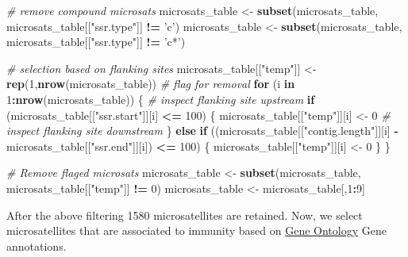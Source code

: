 \documentclass[]{article}
\newenvironment{Shaded}{\begin{snugshade}}{\end{snugshade}}
\newcommand{\KeywordTok}[1]{\textcolor[rgb]{0.13,0.29,0.53}{\textbf{#1}}}
\newcommand{\DecValTok}[1]{\textcolor[rgb]{0.00,0.00,0.81}{#1}}
\newcommand{\StringTok}[1]{\textcolor[rgb]{0.31,0.60,0.02}{#1}}
\newcommand{\CommentTok}[1]{\textcolor[rgb]{0.56,0.35,0.01}{\textit{#1}}}
\newcommand{\ControlFlowTok}[1]{\textcolor[rgb]{0.13,0.29,0.53}{\textbf{#1}}}
\newcommand{\OperatorTok}[1]{\textcolor[rgb]{0.81,0.36,0.00}{\textbf{#1}}}
\newcommand{\NormalTok}[1]{#1}
\begin{document}
\begin{Shaded}
\begin{Highlighting}[]
\CommentTok{# remove compound microsats}
\NormalTok{microsats_table <-}\StringTok{ }
\StringTok{  }\KeywordTok{subset}\NormalTok{(microsats_table, microsats_table[[}\StringTok{"ssr.type"}\NormalTok{]] }\OperatorTok{!=}\StringTok{ 'c'}\NormalTok{) }
\NormalTok{microsats_table <-}\StringTok{ }
\StringTok{  }\KeywordTok{subset}\NormalTok{(microsats_table, microsats_table[[}\StringTok{"ssr.type"}\NormalTok{]] }\OperatorTok{!=}\StringTok{ 'c*'}\NormalTok{)}

\CommentTok{# selection based on flanking sites}
\NormalTok{microsats_table[[}\StringTok{"temp"}\NormalTok{]] <-}
\StringTok{  }\KeywordTok{rep}\NormalTok{(}\DecValTok{1}\NormalTok{,}\KeywordTok{nrow}\NormalTok{(microsats_table)) }\CommentTok{# flag for removal}
\ControlFlowTok{for}\NormalTok{ (i }\ControlFlowTok{in} \DecValTok{1}\OperatorTok{:}\KeywordTok{nrow}\NormalTok{(microsats_table)) \{}
  \CommentTok{# inspect flanking site upstream}
\ControlFlowTok{if}\NormalTok{ (microsats_table[[}\StringTok{"ssr.start"}\NormalTok{]][i] }\OperatorTok{<=}\StringTok{ }\DecValTok{100}\NormalTok{) \{}
\NormalTok{      microsats_table[[}\StringTok{"temp"}\NormalTok{]][i] <-}\StringTok{ }\DecValTok{0}
      \CommentTok{# inspect flanking site downstream}
\NormalTok{\} }\ControlFlowTok{else} \ControlFlowTok{if}\NormalTok{ ((microsats_table[[}\StringTok{"contig.length"}\NormalTok{]][i] }\OperatorTok{-}
\StringTok{            }\NormalTok{microsats_table[[}\StringTok{"ssr.end"}\NormalTok{]][i]) }\OperatorTok{<=}\StringTok{ }\DecValTok{100}\NormalTok{) \{}
\NormalTok{    microsats_table[[}\StringTok{"temp"}\NormalTok{]][i] <-}\StringTok{ }\DecValTok{0}
\NormalTok{  \}}
\NormalTok{\}  }

\CommentTok{# Remove flaged microsats}
\NormalTok{microsats_table <-}\StringTok{ }\KeywordTok{subset}\NormalTok{(microsats_table, microsats_table[[}\StringTok{"temp"}\NormalTok{]] }\OperatorTok{!=}\StringTok{ }\DecValTok{0}\NormalTok{) }
\NormalTok{microsats_table <-}\StringTok{ }\NormalTok{microsats_table[,}\DecValTok{1}\OperatorTok{:}\DecValTok{9}\NormalTok{]}
\end{Highlighting}
\end{Shaded}

After the above filtering 1580 microsatellites are retained. Now, we
select microsatellites that are associated to immunity based on
\href{http://www.geneontology.org/}{Gene Ontology} Gene annotations.
\end{document}
